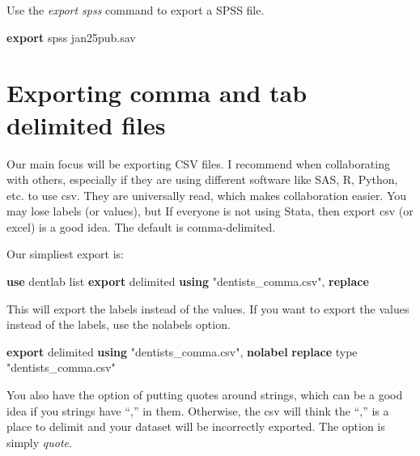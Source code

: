 \documentclass[
]{book}
\newenvironment{Shaded}{\begin{snugshade}}{\end{snugshade}}
\newcommand{\DecValTok}[1]{\textcolor[rgb]{0.00,0.00,0.81}{#1}}
\newcommand{\KeywordTok}[1]{\textcolor[rgb]{0.13,0.29,0.53}{\textbf{#1}}}
\newcommand{\NormalTok}[1]{#1}
\newcommand{\OtherTok}[1]{\textcolor[rgb]{0.56,0.35,0.01}{#1}}
\newcommand{\StringTok}[1]{\textcolor[rgb]{0.31,0.60,0.02}{#1}}
\begin{document}
Use the \emph{export spss} command to export a SPSS file.

\begin{Shaded}
\begin{Highlighting}[]
\KeywordTok{export}\NormalTok{ spss jan25pub.sav}
\end{Highlighting}
\end{Shaded}

\section{Exporting comma and tab delimited files}\label{exporting-comma-and-tab-delimited-files}

Our main focus will be exporting CSV files.
I recommend when collaborating with others, especially if they are using
different software like SAS, R, Python, etc. to use csv. They are universally
read, which makes collaboration easier. You may lose labels (or values), but
If everyone is not using Stata, then export csv (or excel) is a good idea.
The default is comma-delimited.

Our simpliest export is:

\begin{Shaded}
\begin{Highlighting}[]
\KeywordTok{use}\NormalTok{ dentlab}
\OtherTok{list}
\KeywordTok{export}\NormalTok{ delimited }\KeywordTok{using} \StringTok{"dentists\_comma.csv"}\NormalTok{, }\KeywordTok{replace}
\end{Highlighting}
\end{Shaded}

This will export the labels instead of the values. If you want to export the values instead of the labels, use the nolabels option.

\begin{Shaded}
\begin{Highlighting}[]
\KeywordTok{export}\NormalTok{ delimited }\KeywordTok{using} \StringTok{"dentists\_comma.csv"}\NormalTok{, }\KeywordTok{nolabel} \KeywordTok{replace}    
\DecValTok{type} \StringTok{"dentists\_comma.csv"}
\end{Highlighting}
\end{Shaded}

You also have the option of putting quotes around strings, which can be a good idea if you strings have ``,'' in them. Otherwise, the csv will think the ``,'' is a place to delimit and your dataset will be incorrectly exported.
The option is simply \emph{quote}.
\end{document}
